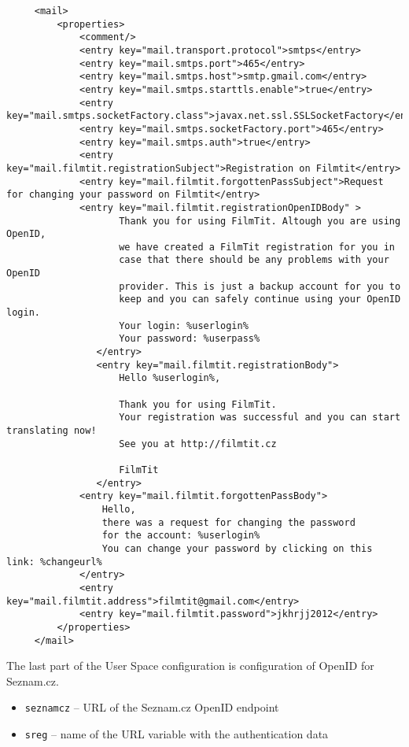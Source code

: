\begin{lstlisting}
     <mail>
         <properties>
             <comment/>
             <entry key="mail.transport.protocol">smtps</entry>
             <entry key="mail.smtps.port">465</entry>
             <entry key="mail.smtps.host">smtp.gmail.com</entry>
             <entry key="mail.smtps.starttls.enable">true</entry>
             <entry key="mail.smtps.socketFactory.class">javax.net.ssl.SSLSocketFactory</entry>
             <entry key="mail.smtps.socketFactory.port">465</entry>
             <entry key="mail.smtps.auth">true</entry>
             <entry key="mail.filmtit.registrationSubject">Registration on Filmtit</entry>
             <entry key="mail.filmtit.forgottenPassSubject">Request for changing your password on Filmtit</entry>
             <entry key="mail.filmtit.registrationOpenIDBody" >
                    Thank you for using FilmTit. Altough you are using OpenID,  
                    we have created a FilmTit registration for you in
                    case that there should be any problems with your OpenID 
                    provider. This is just a backup account for you to
                    keep and you can safely continue using your OpenID login.
                    Your login: %userlogin%
                    Your password: %userpass%
                </entry>
                <entry key="mail.filmtit.registrationBody">
                    Hello %userlogin%,

                    Thank you for using FilmTit.
                    Your registration was successful and you can start translating now!
                    See you at http://filmtit.cz

                    FilmTit
                </entry>
             <entry key="mail.filmtit.forgottenPassBody">
                 Hello,
                 there was a request for changing the password
                 for the account: %userlogin%
                 You can change your password by clicking on this link: %changeurl%
             </entry>
             <entry key="mail.filmtit.address">filmtit@gmail.com</entry>
             <entry key="mail.filmtit.password">jkhrjj2012</entry>
         </properties>
     </mail>
\end{lstlisting}

The last part of the User Space configuration is configuration of
OpenID for Seznam.cz.

\begin{itemize}
\item \verb#seznamcz# -- URL of the Seznam.cz OpenID endpoint
\item \verb#sreg# -- name of the URL variable with the authentication data
\end{itemize}

